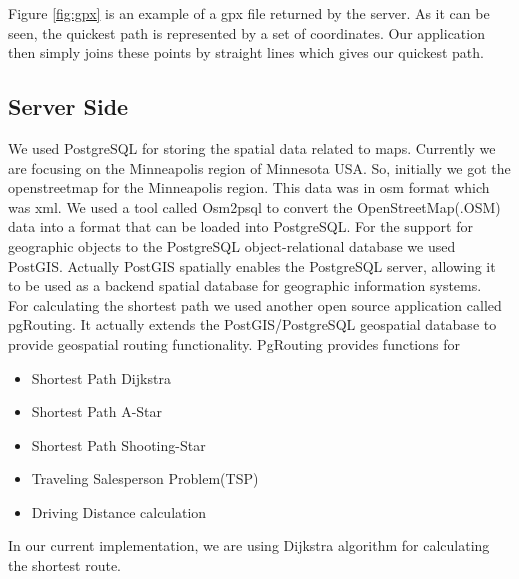 \documentclass[a4paper,12pt, notitlepage, oneside, onecolumn]{article}
\begin{document}
Figure \ref{fig:gpx} is an example of a gpx file returned by the server. As it can be seen, the quickest path is represented by a set of coordinates. Our application then simply joins these points by straight lines which gives our quickest path.

\subsection{Server Side}
We used PostgreSQL\cite{postgressql} for storing the spatial data related to maps.  Currently we are focusing on the Minneapolis region of Minnesota USA. So, initially we got the openstreetmap for the Minneapolis region. This data was  in osm format which was xml. We used a tool called Osm2psql\cite{osm2psql}  to convert the  OpenStreetMap(.OSM) data into a format that can be loaded into PostgreSQL. For the support for geographic objects to the PostgreSQL object-relational database we used PostGIS\cite{postgis}. Actually PostGIS  spatially enables the PostgreSQL server, allowing it to be used as a backend spatial database for geographic information systems.\\

For calculating the shortest path we used another open source application called pgRouting\cite{pgrouting}. It actually extends the PostGIS/PostgreSQL geospatial database to provide geospatial routing functionality. PgRouting provides functions for

\begin{itemize}
\item Shortest Path Dijkstra
\item Shortest Path A-Star
\item Shortest Path Shooting-Star
\item Traveling Salesperson Problem(TSP)
\item Driving Distance calculation
\end{itemize}

In our current implementation, we are using Dijkstra algorithm for calculating the shortest route.
\end{document}
